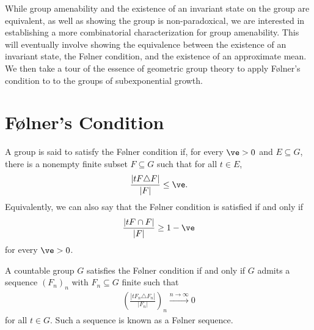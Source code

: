 While group amenability and the existence of an invariant state on the group are equivalent, as well as showing the group is non-paradoxical, we are interested in establishing a more combinatorial characterization for group amenability. This will eventually involve showing the equivalence between the existence of an invariant state, the Følner condition, and the existence of an approximate mean. We then take a tour of the essence of geometric group theory to apply Følner's condition to to the groups of subexponential growth.
\section{Følner's Condition}%
\begin{definition}\label{def:folner_condition}
  A group is said to satisfy the {Følner condition} if, for every $\ve > 0$ and $E\subseteq G$, there is a nonempty finite subset $F\subseteq G$ such that for all $t\in E$,
  \begin{align*}
    \frac{\left\vert tF\triangle F \right\vert}{\left\vert F \right\vert}\leq \ve.
  \end{align*}
  Equivalently, we can also say that the Følner condition is satisfied if and only if
  \begin{align*}
    \frac{\left\vert tF\cap F \right\vert}{\left\vert F \right\vert} \geq 1 - \ve
  \end{align*}
  for every $\ve > 0$.
\end{definition}
\begin{lemma}\label{lemma:folner_sequences}
  A countable group $G$ satisfies the Følner condition if and only if $G$ admits a sequence $\left(F_n\right)_n$ with $F_n\subseteq G$ finite such that
  \begin{align*}
    \left(\frac{\left\vert tF_n\triangle F_n \right\vert}{\left\vert F_n \right\vert}\right)_n \xrightarrow{n\rightarrow \infty}0
  \end{align*}
  for all $t\in G$. Such a sequence is known as a Følner sequence.
\end{lemma}
